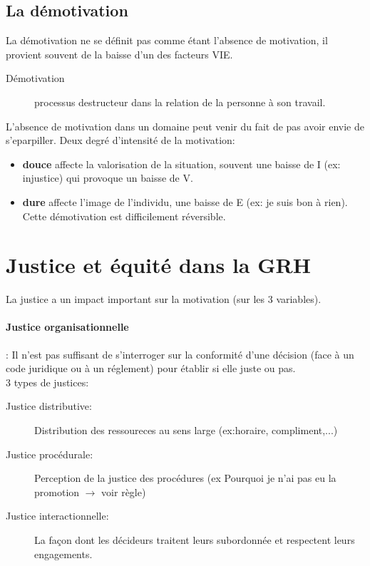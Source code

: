 \documentclass[11pt]{article} %
\begin{document}
	\subsection{La démotivation}
		La démotivation ne se définit pas comme étant l'absence de motivation, il provient souvent de la baisse d'un des facteurs VIE.
		\begin{description}
			\item[Démotivation] processus destructeur dans la relation de la personne à son travail.
		\end{description} L'absence de motivation dans un 
		domaine peut venir du fait de pas avoir envie de s'eparpiller. Deux degré d'intensité de la motivation:
		\begin{itemize}
			\item \textbf{douce} affecte la valorisation de la situation, souvent une baisse de I (ex: injustice) 
			qui 	provoque un baisse de V.
			\item \textbf{dure} affecte l'image de l'individu, une baisse de E (ex: je suis bon à rien). Cette 
			démotivation est difficilement réversible.
		\end{itemize}





\section{Justice et équité dans la GRH}
	La justice a un impact important sur la motivation (sur les 3 variables).
	\paragraph{Justice organisationnelle}: Il n'est pas suffisant de s'interroger sur la conformité d'une décision (face à un code juridique ou à un réglement) pour établir si elle juste ou pas.\\
	3 types de justices: 
	\begin{description}
		\item[Justice distributive:] Distribution des ressoureces au sens large (ex:horaire, compliment,...)
		\item[Justice procédurale:] Perception de la justice des procédures (ex Pourquoi je n'ai pas eu la 
		promotion $\to$ voir règle)
		\item[Justice interactionnelle:] La façon dont les décideurs traitent leurs subordonnée et respectent 
		leurs engagements.
	\end{description}
\end{document}
